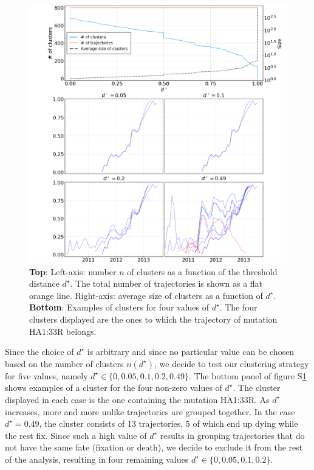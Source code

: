 \documentclass[reprint,amsmath,amssymb,superscriptaddress,showpacs,rmp]{revtex4-1}
\newcommand{\sref}[1]{S\ref{#1}}
\begin{document}
\begin{figure}
	\centering
	\includegraphics[scale=0.5]{Rev_figures/clusters_examples.png}
	\caption{\textbf{Top}: Left-axis: number $n$ of clusters as a function of the threshold distance $d^\star$. The total number of trajectories is shown as a flat orange line. Right-axis: average size of clusters as a function of $d^\star$. \textbf{Bottom}: Examples of clusters for four values of $d^\star$. The four clusters displayed are the ones to which the trajectory of mutation HA1:33R belongs. }
	\label{fig:cluster_examples}
\end{figure}

Since the choice of $d^\star$ is arbitrary and since no particular value can be chosen based on the number of clusters $n(d^\star)$, we decide to test our clustering strategy for five values, namely $d^\star\in\{0, 0.05, 0.1, 0.2, 0.49\}$.
The bottom panel of figure \sref{fig:cluster_examples} shows examples of a cluster for the four non-zero values of $d^\star$.
The cluster displayed in each case is the one containing the mutation HA1:33R.
As $d^\star$ increases, more and more unlike trajectories are grouped together.
In the case $d^\star=0.49$, the cluster consists of 13 trajectories, 5 of which end up dying while the rest fix.
Since such a high value of $d^\star$ results in grouping trajectories that do not have the same fate (fixation or death), we decide to exclude it from the rest of the analysis, resulting in four remaining values $d^\star\in\{0, 0.05, 0.1, 0.2\}$. \\
\end{document}
